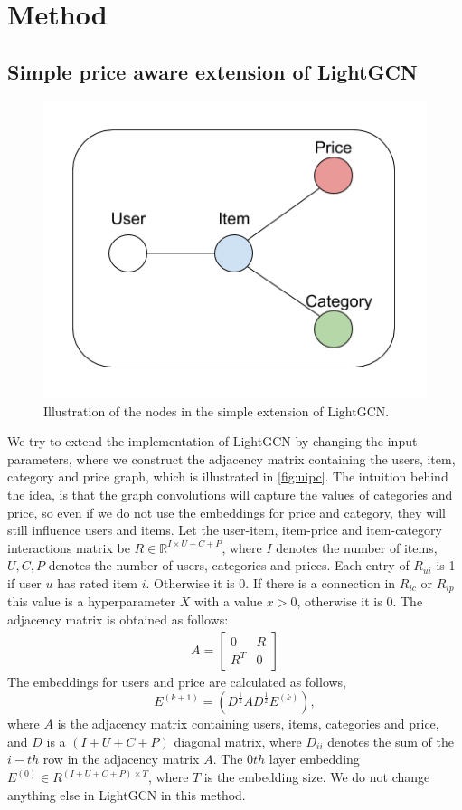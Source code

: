 \section{Method}

\subsection{Simple price aware extension of LightGCN}\label{subsec:simple-extension}
\begin{figure}
    \centering
    \includegraphics[scale=0.5]{figures/uipc.png}
    \caption{Illustration of the nodes in the simple extension of LightGCN.}   
    \label{fig:uipc}
\end{figure}
We try to extend the implementation of LightGCN by changing the input parameters, where we construct the adjacency matrix containing the users, item, category and price graph, which is illustrated in \autoref{fig:uipc}.
The intuition behind the idea, is that the graph convolutions will capture the values of categories and price, so even if we do not use the embeddings for price and category, they will still influence users and items.
Let the user-item, item-price and item-category interactions matrix be $R \in \mathbb{R}^{I \times U + C + P}$, where $I$ denotes the number of items, $U, C, P$ denotes the number of users, categories and prices.
Each entry of $R_{ui}$ is 1 if user $u$ has rated item $i$. Otherwise it is 0.
If there is a connection in $R_{ic}$ or $R_{ip}$ this value is a hyperparameter $X$ with a value $x>0$, otherwise it is 0. 
The adjacency matrix is obtained as follows:
\begin{gather}
    A = 
    \begin{bmatrix}
        0 & R \\
        R^T & 0
    \end{bmatrix}
\end{gather}
The embeddings for users and price are calculated as follows,
\begin{equation}
    E^{(k+1)} = (D^{\frac{1}{2}}AD^{\frac{1}{2}}E^{(k)}),
\end{equation}
where $A$ is the adjacency matrix containing users, items, categories and price, and $D$ is a $(I + U + C + P)$ diagonal matrix, where $D_{ii}$ denotes the sum of the $i-th$ row in the adjacency matrix $A$. 
The $0th$ layer embedding $E^{(0)} \in R^{(I + U + C + P)\times T}$, where $T$ is the embedding size.
We do not change anything else in LightGCN in this method.
